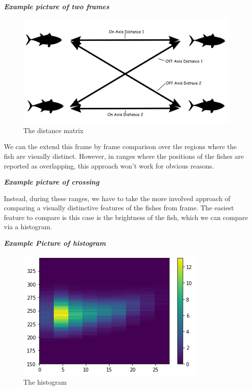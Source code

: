 \documentclass[12pt]{article}
\begin{document}
\textbf{\textit{Example picture of two frames}}

\begin{figure}[H]
	\centering
	\includegraphics[width=.75\linewidth]{fish2}
	\caption{The distance matrix}
	\label{fig:fish2}
\end{figure}

We can the extend this frame by frame comparison over the regions where the fish are visually distinct. However, in ranges where the positions of the fishes are reported as overlapping, this approach won't work for obvious reasons. 

\textbf{\textit{Example picture of crossing}}

Instead, during these ranges, we have to take the more involved approach of comparing a visually distinctive features of the fishes from frame. The easiest feature to compare is this case is the brightness of the fish, which we can compare via a histogram.

\textbf{\textit{Example Picture of histogram}}

\begin{figure}[H]
	\centering
	\includegraphics[width=.75\linewidth]{hist}
	\caption{The histogram}
	\label{fig:hist}
\end{figure}

\end{document}
